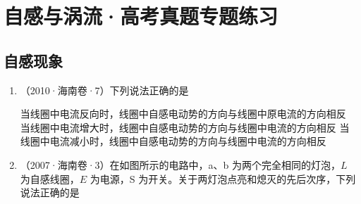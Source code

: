 \documentclass[\gkver]{gaokaozhenti}
\newcommand{\source}[1]{{\sffamily（#1）}}
\begin{document}
\chapter{自感与涡流·高考真题专题练习}

\section{自感现象}
\begin{enumerate}
\item
\source{2010·海南卷·7}下列说法正确的是

{当线圈中电流反向时，线圈中自感电动势的方向与线圈中原电流的方向相反}
{当线圈中电流增大时，线圈中自感电动势的方向与线圈中电流的方向相反}
{当线圈中电流减小时，线圈中自感电动势的方向与线圈中电流的方向相反}


\item
\source{2007·海南卷·3}在如图所示的电路中，a、b 为两个完全相同的灯泡，$L$ 为自感线圈，$E$ 为电源，S 为开关。关于两灯泡点亮和熄灭的先后次序，下列说法正确的是

\onepicture[w=3.6cm]{}


\end{enumerate}
\end{document}
